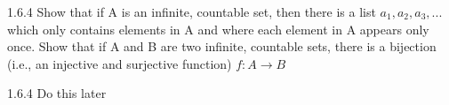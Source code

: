 \documentclass[a4paper,norsk]{article}
\begin{document}
\begin{oppgavebox}{1.6.4}{}
Show that if A is an infinite, countable set, then there is a list $a_1,a_2,a_3,...$ which only contains elements in A and where each element in A appears only once. Show that if A and B are two infinite, countable sets, there is a bijection (i.e., an injective and surjective function) $f : A \rightarrow B$

\begin{proofbox}{1.6.4}{}
  Do this later
\end{proofbox}
\end{oppgavebox}
\end{document}
